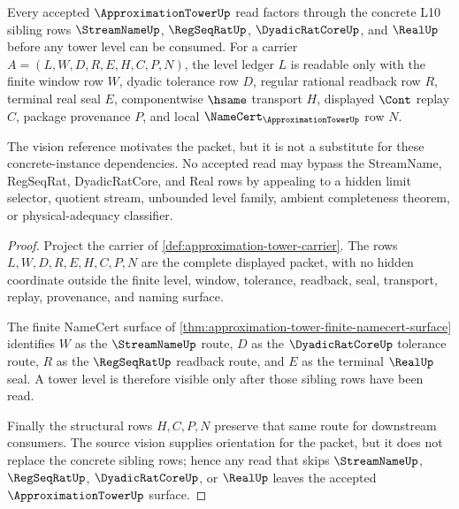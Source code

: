 \begin{theorem}
\label{thm:approximation-tower-l10-sibling-route}
Every accepted $\ApproximationTowerUp$ read factors through the concrete L10 sibling rows $\StreamNameUp$, $\RegSeqRatUp$, $\DyadicRatCoreUp$, and $\RealUp$ before any tower level can be consumed. For a carrier $A=(L,W,D,R,E,H,C,P,N)$, the level ledger $L$ is readable only with the finite window row $W$, dyadic tolerance row $D$, regular rational readback row $R$, terminal real seal $E$, componentwise $\hsame$ transport $H$, displayed $\Cont$ replay $C$, package provenance $P$, and local $\NameCert_{\ApproximationTowerUp}$ row $N$.

The vision reference motivates the packet, but it is not a substitute for these concrete-instance dependencies. No accepted read may bypass the StreamName, RegSeqRat, DyadicRatCore, and Real rows by appealing to a hidden limit selector, quotient stream, unbounded level family, ambient completeness theorem, or physical-adequacy classifier.
\end{theorem}
\begin{proof}
Project the carrier of \autoref{def:approximation-tower-carrier}. The rows $L,W,D,R,E,H,C,P,N$ are the complete displayed packet, with no hidden coordinate outside the finite level, window, tolerance, readback, seal, transport, replay, provenance, and naming surface.

The finite NameCert surface of \autoref{thm:approximation-tower-finite-namecert-surface} identifies $W$ as the $\StreamNameUp$ route, $D$ as the $\DyadicRatCoreUp$ tolerance route, $R$ as the $\RegSeqRatUp$ readback route, and $E$ as the terminal $\RealUp$ seal. A tower level is therefore visible only after those sibling rows have been read.

Finally the structural rows $H,C,P,N$ preserve that same route for downstream consumers. The source vision supplies orientation for the packet, but it does not replace the concrete sibling rows; hence any read that skips $\StreamNameUp$, $\RegSeqRatUp$, $\DyadicRatCoreUp$, or $\RealUp$ leaves the accepted $\ApproximationTowerUp$ surface.
\end{proof}

